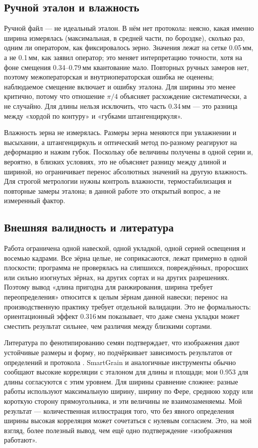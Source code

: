 \documentclass[12pt,a4paper]{article}
\begin{document}
\subsection{Ручной эталон и влажность}

Ручной файл — не идеальный эталон. В нём нет протокола: неясно, какая
именно ширина измерялась (максимальная, в средней части, по бороздке),
сколько раз, одним ли оператором, как фиксировалось зерно. Значения
лежат на сетке \num{0.05}\,мм, а не \num{0.1}\,мм, как заявил оператор;
это меняет интерпретацию точности, хотя на фоне смещения
\num{0.34}--\num{0.79}\,мм квантование мало. Повторных ручных замеров
нет, поэтому межоператорская и внутриоператорская ошибка не оценены;
наблюдаемое смещение включает и ошибку эталона. Для ширины это менее
критично, потому что отношение $\pi/4$ объясняет расхождение
систематически, а не случайно. Для длины нельзя исключить, что часть
\num{0.34}\,мм — это разница между «хордой по контуру» и «губками
штангенциркуля».

Влажность зерна не измерялась. Размеры зерна меняются при увлажнении и
высыхании, а штангенциркуль и оптический метод по-разному реагируют на
деформацию и нажим губок. Поскольку обе величины получены в одной
серии и, вероятно, в близких условиях, это не объясняет разницу между
длиной и шириной, но ограничивает перенос абсолютных значений на
другую влажность. Для строгой метрологии нужны контроль влажности,
термостабилизация и повторные замеры эталона; в данной работе это
открытый вопрос, а не измеренный фактор.

\subsection{Внешняя валидность и литература}

Работа ограничена одной навеской, одной укладкой, одной серией
освещения и восемью кадрами. Все зёрна целые, не соприкасаются, лежат
примерно в одной плоскости; программа не проверялась на слипшихся,
повреждённых, проросших или сильно изогнутых зёрнах, на других сортах и
на других разрешениях. Поэтому вывод «длина пригодна для ранжирования,
ширина требует переопределения» относится к целым зёрнам данной
навески; перенос на производственную практику требует отдельной
валидации. Это не формальность: ориентационный эффект
\num{0.316}\,мм показывает, что даже смена укладки может сместить
результат сильнее, чем различия между близкими сортами.

Литература по фенотипированию семян подтверждает, что изображения дают
устойчивые размеры и форму, но подчёркивает зависимость результатов от
определений и протокола \cite{li2014,tanabata2012,igathinathane2008}.
SmartGrain и аналогичные инструменты обычно сообщают высокие
корреляции с эталоном для длины и площади; мои \num{0.953} для длины
согласуются с этим уровнем. Для ширины сравнение сложнее: разные
работы используют максимальную ширину, ширину по Фере, среднюю хорду
или короткую сторону прямоугольника, и эти величины не
взаимозаменяемы. Мой результат — количественная иллюстрация того, что
без явного определения ширины высокая корреляция может сочетаться с
нулевым согласием. Это, на мой взгляд, более полезный вывод, чем ещё
одно подтверждение «изображения работают».
\end{document}
